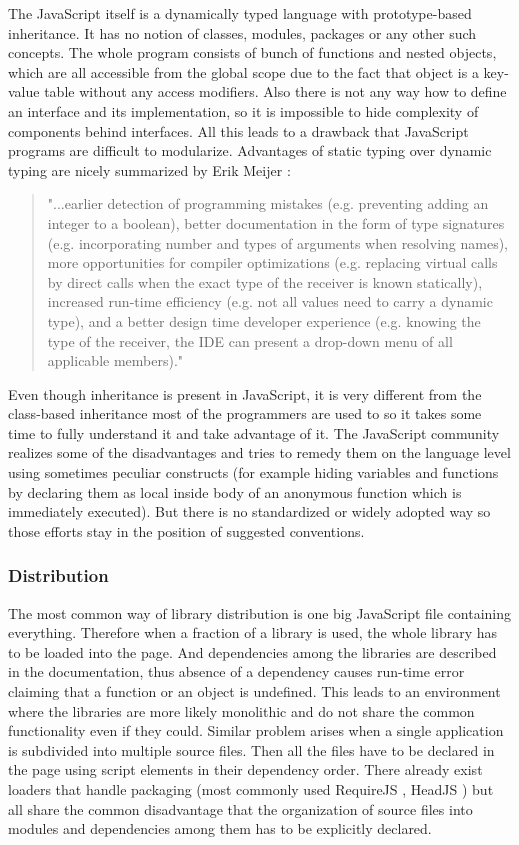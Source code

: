 \documentclass[12pt,a4paper]{report}
\begin{document}
The JavaScript itself is a dynamically typed language with prototype-based inheritance. It has no notion of classes, modules, packages or any other such concepts. The whole program consists of bunch of functions and nested objects, which are all accessible from the global scope due to the fact that object is a key-value table without any access modifiers. Also there is not any way how to define an interface and its implementation, so it is impossible to hide complexity of components behind interfaces. All this leads to a drawback that JavaScript programs are difficult to modularize. Advantages of static typing over dynamic typing are nicely summarized by Erik Meijer \cite{Meijer}: 

\begin{quote}
"...earlier detection of programming mistakes (e.g. preventing adding an integer to a boolean), better documentation in the form of type signatures (e.g. incorporating number and types of arguments when resolving names), more opportunities for compiler optimizations (e.g. replacing virtual calls by direct calls when the exact type of the receiver is known statically), increased run-time efficiency (e.g. not all values need to carry a dynamic type), and a better design time developer experience (e.g. knowing the type of the receiver, the IDE can present a drop-down menu of all applicable members)."
\end{quote}

Even though inheritance is present in JavaScript, it is very different from the class-based inheritance most of the programmers are used to so it takes some time to fully understand it and take advantage of it. The JavaScript community realizes some of the disadvantages and tries to remedy them on the language level using sometimes peculiar constructs (for example hiding variables and functions by declaring them as local inside body of an anonymous function which is immediately executed). But there is no standardized or widely adopted way so those efforts stay in the position of suggested conventions.

\subsubsection*{Distribution} 

The most common way of library distribution is one big JavaScript file containing everything. Therefore when a fraction of a library is used, the whole library has to be loaded into the page. And dependencies among the libraries are described in the documentation, thus absence of a dependency causes run-time error claiming that a function or an object is undefined. This leads to an environment where the libraries are more likely monolithic and do not share the common functionality even if they could. Similar problem arises when a single application is subdivided into multiple source files. Then all the files have to be declared in the page using script elements in their dependency order. There already exist loaders that handle packaging (most commonly used RequireJS \cite{RequireJs}, HeadJS \cite{HeadJs}) but all share the common disadvantage that the organization of source files into modules and dependencies among them has to be explicitly declared.
\end{document}
